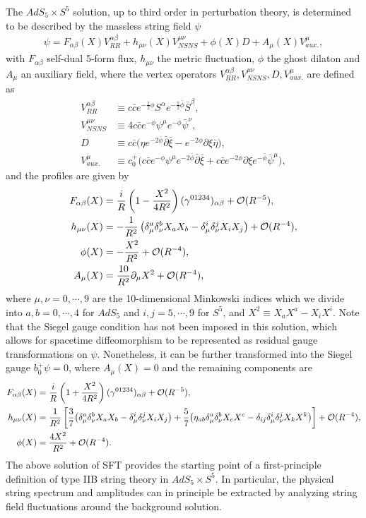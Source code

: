 \documentclass[12pt]{article}
\def\ie{\begin{equation}\begin{aligned}}
\def\fe{\end{aligned}\end{equation}}
\numberwithin{equation}{section}
\begin{document}
The $AdS_5\times S^5$ solution, up to third order in perturbation theory, is determined to be described by the massless string field $\psi$
\ie\label{masslessansatzint}
    \psi = F_{\alpha \beta}(X) V^{\alpha\beta}_{RR}+ h_{\mu\nu}(X) V^{\mu \nu}_{NSNS} + \phi(X) D + A_{\mu}(X) V^\mu_{aux.},
\fe
with $F_{\alpha \beta}$ self-dual 5-form flux, $h_{\mu \nu}$ the metric fluctuation, $\phi$ the ghost dilaton and $A_\mu$ an auxiliary field,
where the vertex operators $V^{\alpha\beta}_{RR},V^{\mu \nu}_{NSNS},D, V^\mu_{aux.}$ are defined as
\ie\label{vertdefint}
    V^{\alpha \beta}_{RR} &\equiv c\bar{c} e^{-\frac{1}{2}\phi} S^\alpha e^{-\frac{1}{2}\bar{\phi}}\bar{S}^\beta ,
    \\
    V^{\mu \nu}_{NSNS} &\equiv 4c \bar{c} e^{-\phi} \psi^\mu e^{-\bar{\phi}}\bar{\psi}^\nu ,
    \\
    D & \equiv c\bar{c}\big(\eta e^{-2\bar{\phi}} \bar{\partial} \bar{\xi} - e^{-2\phi}\partial \xi \bar{\eta}\big) ,
    \\
    V^\mu_{aux.} &\equiv c_0^+\big(c \bar{c} e^{-\phi} \psi^\mu e^{-2\bar{\phi}}\bar{\partial}\bar{\xi} + c \bar{c} e^{-2\phi} \partial \xi e^{-\bar{\phi}} \bar{\psi}^\mu\big),
\fe
and the profiles are given by
\ie\label{covsol}
    F_{\alpha \beta}(X) &= {i\over R} \left( 1- {X^2\over 4R^2} \right) (\gamma^{01234})_{\alpha \beta} + {\cal O}(R^{-5}) ,
    \\
    h_{\mu \nu}(X) &=  -\frac{1}{R^2} \left(\delta^a_\mu \delta^b_\nu X_a X_b - \delta^i_\mu \delta^j_\nu X_i X_j \right) + {\cal O}(R^{-4}),
    \\
    \phi(X) &=  -\frac{X^2}{R^2} + {\cal O}(R^{-4}),
    \\
    A_\mu(X) &= \frac{10}{R^2} \partial_\mu X^2 + {\cal O}(R^{-4}),
\fe
where $\mu,\nu=0,\cdots,9$ are the 10-dimensional Minkowski indices which we divide into $a,b=0,\cdots,4$ for $AdS_5$ and $i,j=5,\cdots,9$ for $S^5$, and $X^2\equiv X_a X^a-X_i X^i$. Note that the Siegel gauge condition has not been imposed in this solution, which allows for spacetime diffeomorphism to be represented as residual gauge transformations on $\psi$. %
Nonetheless, it can be further transformed into the Siegel gauge $b_0^+\psi=0$, where $A_{\mu}(X)=0$ and the remaining components are
\ie\label{siegelsolution}
    F_{\alpha \beta}(X) &= {i\over R} \left( 1 + {X^2\over 4R^2} \right) (\gamma^{01234})_{\alpha \beta} + {\cal O}(R^{-5}),
    \\
   h_{\mu \nu}(X) &= {1\over R^2} \left[ \frac{3}{7} \big(\delta^a_\mu \delta^b_\nu X_a X_b - \delta^i_\mu \delta^j_\nu X_i X_j\big) +\frac{5}{7}\big(\eta_{ab}\delta_{\mu}^a\delta_{\nu}^bX_cX^c-\delta_{ij}\delta_{\mu}^i\delta_{\nu}^jX_kX^k\big) \right] + {\cal O}(R^{-4}),
   \\
    \phi(X)&= {4 X^2\over R^2} + {\cal O}(R^{-4}) .
\fe
The above solution of SFT provides the starting point of a first-principle definition of type IIB string theory in $AdS_5\times S^5$. In particular, the physical string spectrum and amplitudes can in principle be extracted by analyzing string field fluctuations around the background solution.
\end{document}

